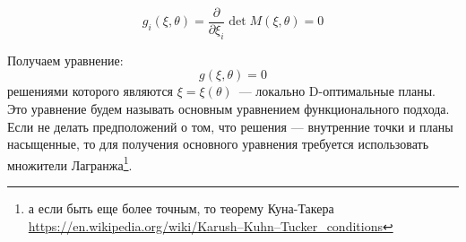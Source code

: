 \begin{equation}
g_i(\xi, \theta) = \frac{\partial{}}{\partial{\xi_i}} \det M(\xi, \theta) = 0
\end{equation} 

Получаем уравнение:
$$g(\xi, \theta) = 0$$
решениями которого являются $\xi = \xi(\theta)$ — локально D-оптимальные планы.  Это уравнение будем называть основным уравнением функционального подхода. %
 Если не делать предположений о том, что решения — внутренние точки и планы насыщенные, то для получения основного уравнения требуется использовать множители Лагранжа\footnote{а если быть еще более точным, то теорему Куна-Такера \url{https://en.wikipedia.org/wiki/Karush–Kuhn–Tucker_conditions}}.
